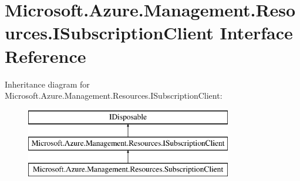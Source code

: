 \hypertarget{interface_microsoft_1_1_azure_1_1_management_1_1_resources_1_1_i_subscription_client}{}\section{Microsoft.\+Azure.\+Management.\+Resources.\+I\+Subscription\+Client Interface Reference}
\label{interface_microsoft_1_1_azure_1_1_management_1_1_resources_1_1_i_subscription_client}


 


Inheritance diagram for Microsoft.\+Azure.\+Management.\+Resources.\+I\+Subscription\+Client\+:\begin{figure}[H]
\begin{center}
\leavevmode
\includegraphics[height=3.000000cm]{interface_microsoft_1_1_azure_1_1_management_1_1_resources_1_1_i_subscription_client}
\end{center}
\end{figure}

